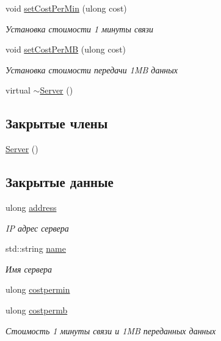 \begin{DoxyCompactItemize}
void \hyperlink{class_network_service_1_1_server_a41772229229e7994706e6494f6366db8}{set\+Cost\+Per\+Min} (ulong cost)
\begin{DoxyCompactList}\small\item\em Установка стоимости 1 минуты связи \end{DoxyCompactList}\item 
void \hyperlink{class_network_service_1_1_server_a05c94527d60ec19810d7d37bd9c8aaa4}{set\+Cost\+Per\+M\+B} (ulong cost)
\begin{DoxyCompactList}\small\item\em Установка стоимости передачи 1\+M\+B данных \end{DoxyCompactList}\item 
virtual \hyperlink{class_network_service_1_1_server_a4b3aa2579cb1c8cd1d069582c14d0fa6}{$\sim$\+Server} ()
\end{DoxyCompactItemize}
\subsection*{Закрытые члены}
\begin{DoxyCompactItemize}
\item 
\hyperlink{class_network_service_1_1_server_ad5ec9462b520e59f7ea831e157ee5e59}{Server} ()
\end{DoxyCompactItemize}
\subsection*{Закрытые данные}
\begin{DoxyCompactItemize}
\item 
ulong \hyperlink{class_network_service_1_1_server_a09382556ff4ab5abc7a79a333ad92329}{address}
\begin{DoxyCompactList}\small\item\em I\+P адрес сервера \end{DoxyCompactList}\item 
std\+::string \hyperlink{class_network_service_1_1_server_aaab7735b4b5809169ecb92fa66f0bca7}{name}
\begin{DoxyCompactList}\small\item\em Имя сервера \end{DoxyCompactList}\item 
ulong \hyperlink{class_network_service_1_1_server_a8b24807f5ca15d5348734cf5f4fe96ff}{costpermin}
\item 
ulong \hyperlink{class_network_service_1_1_server_a44f0b3aacbbbbbcf0216974c23d1baf1}{costpermb}
\begin{DoxyCompactList}\small\item\em Стоимость 1 минуты связи и 1\+M\+B переданных данных \end{DoxyCompactList}\end{DoxyCompactItemize}
